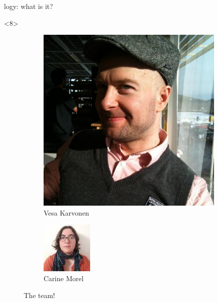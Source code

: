 \begin{frame}[fragile]{\Zoo[]logy: what is it?}
\begin{overbox}<8>
    \begin{figure}
        \begin{subfigure}{0.4\textwidth}
            \includegraphics[scale=0.2]{images/vesa_karvonen.jpg}
            \caption*{\footnotesize Vesa Karvonen}
        \end{subfigure}
        \begin{subfigure}{0.4\textwidth}
            \includegraphics[scale=1]{images/carine_morel.jpg}
            \caption*{\footnotesize Carine Morel}
        \end{subfigure}
        \caption*{The \Saturn team!}
    \end{figure}
\end{overbox}


\end{frame}
